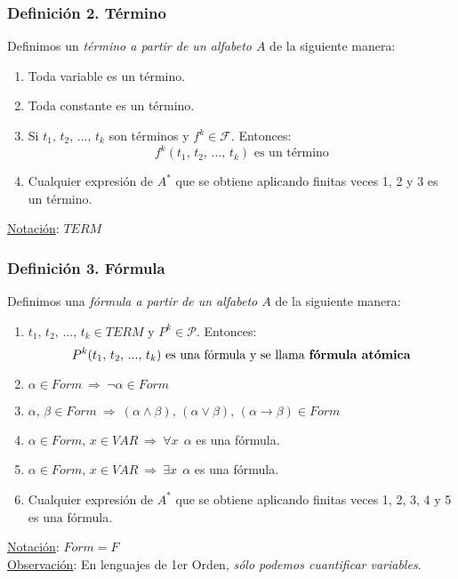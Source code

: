 \documentclass{article}
\newcommand{\comma}{,\,}                                %
\newcommand{\partes}{\mathcal{P}}
\newcommand{\familia}{\mathcal{F}}                      %
\newcommand{\Rightarrows}{\: \Rightarrow \:}            %
\begin{document}
\subsubsection*{Definición 2. Término}
Definimos un \emph{término a partir de un alfabeto $A$} de la siguiente manera:
\begin{enumerate}
    \item Toda variable es un término.
    \item Toda constante es un término.
    \item Si $t_1 \comma t_2 \comma ... \comma t_k$ son términos y $f^k \in \familia$. Entonces:
    \begin{equation*}
        f^k(t_1 \comma t_2 \comma ... \comma t_k) \text{ es un término} 
    \end{equation*}
    \item Cualquier expresión de $A^*$ que se obtiene aplicando finitas veces 1, 2 y 3 es un término.
\end{enumerate}
\underline{Notación}: $TERM$

\subsubsection*{Definición 3. Fórmula}
Definimos una \emph{fórmula a partir de un alfabeto $A$} de la siguiente manera:
\begin{enumerate}
    \item $t_1 \comma t_2 \comma ... \comma t_k \in TERM$ y $P^k \in \partes$. Entonces:
    \begin{equation*}
        P^k(t_1 \comma t_2 \comma ... \comma t_k) \text{ es una fórmula y se llama \textbf{fórmula atómica}}
    \end{equation*}
    \item $\alpha \in Form \Rightarrows \neg \alpha \in Form$
    \item $\alpha \comma \beta \in Form \Rightarrows (\alpha \wedge \beta) \comma (\alpha \vee \beta) \comma (\alpha \rightarrow \beta) \in Form$
    \item $\alpha \in Form \comma x \in VAR \Rightarrows \forall x \:\: \alpha$ es una fórmula.
    \item $\alpha \in Form \comma x \in VAR \Rightarrows \exists x \:\: \alpha$ es una fórmula.
    \item Cualquier expresión de $A^*$ que se obtiene aplicando finitas veces 1, 2, 3, 4 y 5 es una fórmula.
\end{enumerate}
\underline{Notación}: $Form = F$
\\\underline{Observación}: En lenguajes de 1er Orden, \emph{sólo podemos cuantificar variables}.
\end{document}
